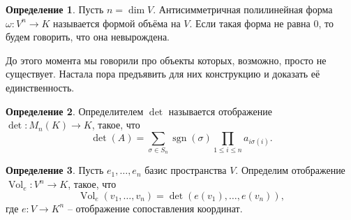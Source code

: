 \documentclass[10pt,a4paper,oneside]{book}
\theoremstyle{definition}
\newtheorem*{defn}{\color{yellow!30!red} Определение}
\renewcommand{\leq}{\leqslant}
\newcommand{\Vol}{\operatorname{Vol}}
\newcommand{\sgn}{\operatorname{sgn}}
\def\dfn{\begin{defn}}
\def\edfn{\end{defn}}
\begin{document}
\begin{defn}
Пусть $n=\dim V$. Антисимметричная полилинейная форма $\omega \colon V^n \to K $ называется формой объёма на $V$. Если такая форма не равна 0, то будем говорить, что она невырождена.
\end{defn}



До этого момента мы говорили про объекты которых, возможно, просто не существует. Настала пора предъявить для них конструкцию и доказать её единственность.

\dfn  Определителем $\det$ называется отображение $\det \colon M_n(K) \to K$, такое, что $$\det(A)=\sum_{\sigma \in S_n} \sgn(\sigma)\prod_{1\leq i\leq n} a_{i\sigma(i)}.$$
\edfn

\dfn Пусть $e_1,\dots,e_n$ базис пространства $V$. Определим отображение $\Vol_e \colon V^n \to K$, такое, что
$$\Vol_e(v_1,\dots,v_n)=\det(e(v_1),\dots, e(v_n)),$$
где $e\colon V \to K^n$ -- отображение сопоставления координат.
\edfn
\end{document}
